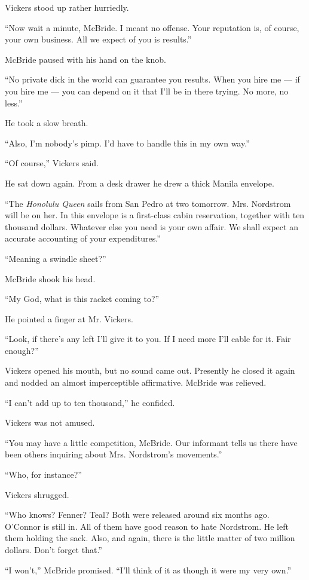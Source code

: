 \documentclass{novel}
\begin{document}
Vickers stood up rather hurriedly.

“Now wait a minute, McBride. I meant no offense. Your reputation is, of course, your own business. All we expect of you is results.”

McBride paused with his hand on the knob.

“No private dick in the world can guarantee you results. When you hire me — if you hire me — you can depend on it that I’ll be in there trying. No more, no less.”

He took a slow breath.

“Also, I’m nobody’s pimp. I’d have to handle this in my own way.”

“Of course,” Vickers said.

He sat down again. From a desk drawer he drew a thick Manila envelope.

“The \textit{Honolulu Queen} sails from San Pedro at two tomorrow. Mrs. Nordstrom will be on her. In this envelope is a first-class cabin reservation, together with ten thousand dollars. Whatever else you need is your own affair. We shall expect an accurate accounting of your expenditures.”

“Meaning a swindle sheet?”

McBride shook his head.

“My God, what is this racket coming to?”

He pointed a finger at Mr. Vickers.

“Look, if there’s any left I’ll give it to you. If I need more I’ll cable for it. Fair enough?”

Vickers opened his mouth, but no sound came out. Presently he closed it again and nodded an almost imperceptible affirmative. McBride was relieved.

“I can’t add up to ten thousand,” he confided.

Vickers was not amused.

“You may have a little competition, McBride. Our informant tells us there have been others inquiring about Mrs. Nordstrom’s movements.”

“Who, for instance?”

Vickers shrugged.

“Who knows? Fenner? Teal? Both were released around six months ago. O’Connor is still in. All of them have good reason to hate Nordstrom. He left them holding the sack. Also, and again, there is the little matter of two million dollars. Don’t forget that.”

“I won’t,” McBride promised. “I’ll think of it as though it were my very own.”
\end{document}

